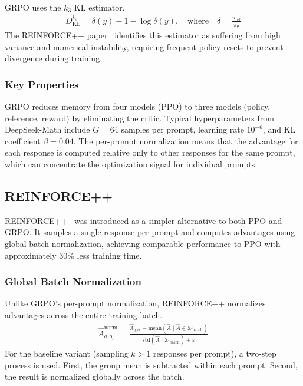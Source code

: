 \documentclass[12pt]{article}
\begin{document}
GRPO uses the $k_3$ KL estimator.
\begin{align}
D_{\text{KL}}^{k_3} = \delta(y) - 1 - \log \delta(y), \quad \text{where} \quad \delta = \frac{\pi_{\text{ref}}}{\pi_\theta}
\end{align}
The REINFORCE++ paper~\cite{Hu2025Reinforce} identifies this estimator as suffering from high variance and numerical instability, requiring frequent policy resets to prevent divergence during training.

\subsubsection{Key Properties}

GRPO reduces memory from four models (PPO) to three models (policy, reference, reward) by eliminating the critic. Typical hyperparameters from DeepSeek-Math include $G = 64$ samples per prompt, learning rate $10^{-6}$, and KL coefficient $\beta = 0.04$. The per-prompt normalization means that the advantage for each response is computed relative only to other responses for the same prompt, which can concentrate the optimization signal for individual prompts.

\subsection{REINFORCE++}

REINFORCE++~\cite{Hu2025Reinforce} was introduced as a simpler alternative to both PPO and GRPO. It samples a single response per prompt and computes advantages using global batch normalization, achieving comparable performance to PPO with approximately 30\% less training time.

\subsubsection{Global Batch Normalization}

Unlike GRPO's per-prompt normalization, REINFORCE++ normalizes advantages across the entire training batch.
\begin{align}
\hat{A}_{q, o_t}^{\text{norm}} = \frac{\hat{A}_{q, o_t} - \text{mean}(\hat{A} \mid \hat{A} \in \mathcal{D}_{\text{batch}})}{\text{std}(\hat{A} \mid \mathcal{D}_{\text{batch}}) + \varepsilon}
\end{align}
For the baseline variant (sampling $k > 1$ responses per prompt), a two-step process is used. First, the group mean is subtracted within each prompt. Second, the result is normalized globally across the batch.
\end{document}
